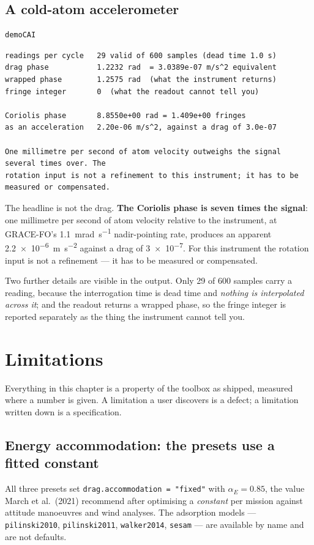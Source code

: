 \documentclass[11pt,a4paper]{report}
\begin{document}
\section{A cold-atom accelerometer}
\begin{lstlisting}
demoCAI
\end{lstlisting}
\begin{lstlisting}
readings per cycle   29 valid of 600 samples (dead time 1.0 s)
drag phase           1.2232 rad  = 3.0389e-07 m/s^2 equivalent
wrapped phase        1.2575 rad  (what the instrument returns)
fringe integer       0  (what the readout cannot tell you)

Coriolis phase       8.8550e+00 rad = 1.409e+00 fringes
as an acceleration   2.20e-06 m/s^2, against a drag of 3.0e-07

One millimetre per second of atom velocity outweighs the signal several times over. The
rotation input is not a refinement to this instrument; it has to be measured or compensated.
\end{lstlisting}

\noindent The headline is not the drag. \textbf{The Coriolis phase is seven times the signal}: one
millimetre per second of atom velocity relative to the instrument, at GRACE-FO's
\SI{1.1}{\milli\radian\per\second} nadir-pointing rate, produces an apparent
\SI{2.2e-6}{\metre\per\second\squared} against a drag of \SI{3e-7}{}. For this instrument the
rotation input is not a refinement --- it has to be measured or compensated.

Two further details are visible in the output. Only 29 of 600 samples carry a reading, because the
interrogation time is dead time and \emph{nothing is interpolated across it}; and the readout
returns a wrapped phase, so the fringe integer is reported separately as the thing the instrument
cannot tell you.
\chapter{Limitations}
\label{ch:limits}

Everything in this chapter is a property of the toolbox as shipped, measured where a number is
given. A limitation a user discovers is a defect; a limitation written down is a specification.

\section{Energy accommodation: the presets use a fitted constant}
\label{sec:lim-accommodation}
All three presets set \texttt{drag.accommodation = "fixed"} with $\alpha_E=0.85$, the value March
et al.\ (2021) recommend after optimising a \emph{constant} per mission against attitude manoeuvres
and wind analyses. The adsorption models --- \texttt{pilinski2010}, \texttt{pilinski2011},
\texttt{walker2014}, \texttt{sesam} --- are available by name and are not defaults.
\end{document}
